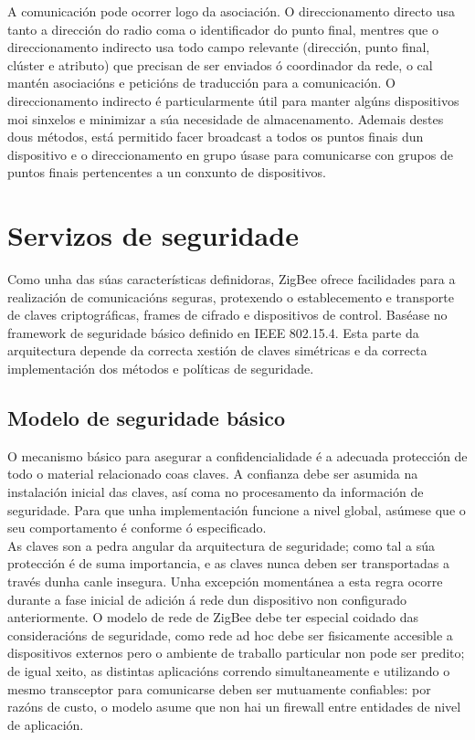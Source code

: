  A comunicación pode ocorrer logo da asociación. O direccionamento directo usa
 tanto a dirección do radio coma o identificador do punto final, mentres que o
 direccionamento indirecto usa todo campo relevante (dirección, punto final,
 clúster e atributo) que precisan de ser enviados ó coordinador da rede, o cal
 mantén asociacións e peticións de traducción para a comunicación. O
 direccionamento indirecto é particularmente útil para manter algúns
 dispositivos moi sinxelos e minimizar a súa necesidade de almacenamento.
 Ademais destes dous métodos, está permitido facer broadcast a todos os puntos
 finais dun dispositivo e o direccionamento en grupo úsase para comunicarse con
 grupos de puntos finais pertencentes a un conxunto de dispositivos.

\section{Servizos de seguridade}

Como unha das súas características definidoras, ZigBee ofrece facilidades para
a realización de comunicacións seguras, protexendo o establecemento e
transporte de claves criptográficas, frames de cifrado e dispositivos de
control. Baséase no framework de seguridade básico definido en IEEE 802.15.4.
Esta parte da arquitectura depende da correcta xestión de claves simétricas e
da correcta implementación dos métodos e políticas de seguridade.

 \subsection{Modelo de seguridade básico}

 O mecanismo básico para asegurar a confidencialidade é a adecuada protección
 de todo o material relacionado coas claves. A confianza debe ser asumida na
 instalación inicial das claves, así coma no procesamento da información de
 seguridade. Para que unha implementación funcione a nivel global, asúmese que
 o seu comportamento é conforme ó especificado. \\

 As claves son a pedra angular da arquitectura de seguridade; como tal a súa
 protección é de suma importancia, e as claves nunca deben ser transportadas a
 través dunha canle insegura. Unha excepción momentánea a esta regra ocorre
 durante a fase inicial de adición á rede dun dispositivo non configurado
 anteriormente. O modelo de rede de ZigBee debe ter especial coidado das
 consideracións de seguridade, como rede ad hoc debe ser fisicamente accesible
 a dispositivos externos pero o ambiente de traballo particular non pode ser
 predito; de igual xeito, as distintas aplicacións correndo simultaneamente e
 utilizando o mesmo transceptor para comunicarse deben ser mutuamente
 confiables: por razóns de custo, o modelo asume que non hai un firewall entre
 entidades de nivel de aplicación. \\


